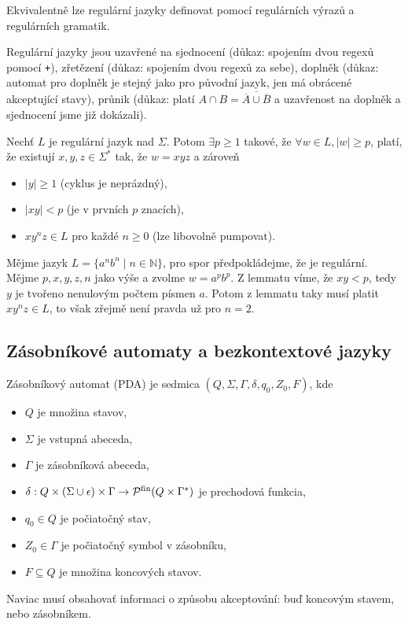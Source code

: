 Ekvivalentně lze regulární jazyky definovat pomocí regulárních výrazů a
regulárních gramatik.

Regulární jazyky jsou uzavřené na sjednocení (důkaz: spojením
dvou regexů pomocí \verb|+|), zřetězení (důkaz: spojením dvou
regexů za sebe), doplněk (důkaz: automat pro doplněk je stejný
jako pro původní jazyk, jen má obrácené akceptující stavy), průnik
(důkaz: platí $A \cap B = \overline{\overline{A} \cup \overline{B}}$ a
uzavřenost na doplněk a sjednocení jsme již dokázali).

\begin{theorem}
Nechť $L$ je regulární jazyk nad $\Sigma$.
Potom
$\exists p \geq 1$ takové,
že $\forall w \in L, \lvert w \rvert \geq p$,
platí, že existují $x,y,z \in \Sigma^*$ tak, že $w = xyz$ a zároveň

\begin{itemize}
    \item $\lvert y \rvert \geq 1$ (cyklus je neprázdný),
    \item $\lvert xy \rvert < p$ (je v prvních $p$ znacích),
    \item $xy^nz \in L$ pro každé $n \geq 0$ (lze libovolně pumpovat).
\end{itemize}
\end{theorem}

\begin{example}
    Mějme jazyk $L = \{ a^n b^n \mid n \in \mathbb{N} \}$,
    pro spor předpokládejme, že je regulární.
    Mějme $p,x,y,z,n$ jako výše a zvolme $w = a^p b^p$.
    Z lemmatu víme, že $xy < p$, tedy $y$ je tvořeno nenulovým počtem
    písmen $a$.  Potom z lemmatu taky musí platit $xy^nz \in L$, to však
    zřejmě není pravda už pro $n = 2$.
\end{example}

\subsection{Zásobníkové automaty a bezkontextové jazyky}

\begin{definition}
    Zásobníkový automat (PDA) je sedmica $(Q, \Sigma, \Gamma, \delta, q_0, Z_0,F)$, kde
	\begin{itemize}
		\item $Q$ je množina stavov,
		\item $\Sigma$ je vstupná abeceda,
		\item $\Gamma$ je zásobníková abeceda,
		\item $\delta : Q \times (\Sigma \cup \epsilon) \times \Gamma \to \mathcal{P}^{\text{fin}}(Q \times \Gamma^*)$ je prechodová funkcia,
		\item $q_0 \in Q$ je počiatočný stav,
		\item $Z_0 \in \Gamma$ je počiatočný symbol v zásobníku,
		\item $F \subseteq Q$ je množina koncových stavov.
	\end{itemize}
    Naviac musí obsahovať informaci o způsobu akceptování: buď koncovým stavem, nebo
    zásobníkem.
\end{definition}

